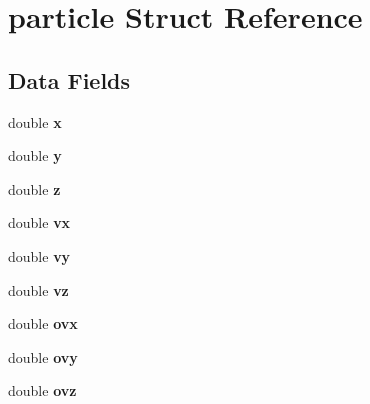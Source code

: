 \hypertarget{structparticle}{
\section{particle Struct Reference}
\label{structparticle}
}
\subsection*{Data Fields}
\begin{DoxyCompactItemize}
\item 
\hypertarget{structparticle_adf124f2f4b2d0a90306893c2889fb1a6}{
double {\bfseries x}}
\label{structparticle_adf124f2f4b2d0a90306893c2889fb1a6}

\item 
\hypertarget{structparticle_aafbd59d3b7e2d80b6c77a63be017a758}{
double {\bfseries y}}
\label{structparticle_aafbd59d3b7e2d80b6c77a63be017a758}

\item 
\hypertarget{structparticle_ae1ba305626c47a5fcea844fb5a8ef870}{
double {\bfseries z}}
\label{structparticle_ae1ba305626c47a5fcea844fb5a8ef870}

\item 
\hypertarget{structparticle_a27d2da5b5c1011d6f21e2006e06c5340}{
double {\bfseries vx}}
\label{structparticle_a27d2da5b5c1011d6f21e2006e06c5340}

\item 
\hypertarget{structparticle_aea55748896289cea56face329d412cd7}{
double {\bfseries vy}}
\label{structparticle_aea55748896289cea56face329d412cd7}

\item 
\hypertarget{structparticle_af3539c02d572ee881f3a6bfad191f96d}{
double {\bfseries vz}}
\label{structparticle_af3539c02d572ee881f3a6bfad191f96d}

\item 
\hypertarget{structparticle_a768f9ddbed7f23834819350f71b90b6d}{
double {\bfseries ovx}}
\label{structparticle_a768f9ddbed7f23834819350f71b90b6d}

\item 
\hypertarget{structparticle_adc96ba4b41245e26b5b34c536dae6842}{
double {\bfseries ovy}}
\label{structparticle_adc96ba4b41245e26b5b34c536dae6842}

\item 
\hypertarget{structparticle_a135e7d6f75cfb33c71f3f9e2213c978c}{
double {\bfseries ovz}}
\label{structparticle_a135e7d6f75cfb33c71f3f9e2213c978c}


\end{DoxyCompactItemize}
